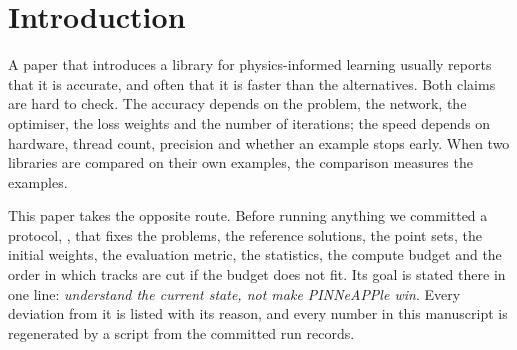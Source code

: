 \documentclass[11pt]{article}
\newcommand{\code}[1]{\protect\path{#1}\xspace}
\begin{document}
\begin{abstract}
We then ask the question the same libraries raise but do not answer: once a prediction exists, can
its physics be checked without a reference solution? On a controlled corpus of 72 predictions over
six problems, checks that need no reference (boundary and initial data, declared bounds,
non-finiteness, PDE residual) flag 28 of 36 single-defect predictions, while the residual check is
scale-invariant for a homogeneous equation and its accuracy is limited by the finite-difference
floor of the grid---0.73 of the term scale for Burgers at the benchmark's own test grid, so it
discriminates nothing there. Of the 8 defects no reference-free check caught, six are the
wrong-coefficient and over-smoothed predictions of the three equations the checker cannot express,
and two are the identically zero field on a problem whose boundary data is zero, which no check
without a reference can distinguish from a solution. We report these limits explicitly rather than
as a footnote, because a verification layer inherits the expressiveness of its equation set.

We make no claim of statistical significance: with 3 to 5 seeds the exact sign test cannot reach
$p<0.05$, so differences are reported with their spread. Everything here runs on a CPU; no GPU or
multi-GPU path was exercised, and the cost figures are single-threaded CPU measurements.
\end{abstract}

\section{Introduction}

A paper that introduces a library for physics-informed learning usually reports that it is
accurate, and often that it is faster than the alternatives. Both claims are hard to check. The
accuracy depends on the problem, the network, the optimiser, the loss weights and the number of
iterations; the speed depends on hardware, thread count, precision and whether an example stops
early. When two libraries are compared on their own examples, the comparison measures the examples.

This paper takes the opposite route. Before running anything we committed a protocol,
\code{benchmarks/vs_frameworks/PROTOCOL.md}, that fixes the problems, the reference solutions,
the point sets, the initial weights, the evaluation metric, the statistics, the compute budget and
the order in which tracks are cut if the budget does not fit. Its goal is stated there in one line:
\emph{understand the current state, not make PINNeAPPle win}. Every deviation from it is listed
with its reason, and every number in this manuscript is regenerated by a script from the committed
run records.
\end{document}
